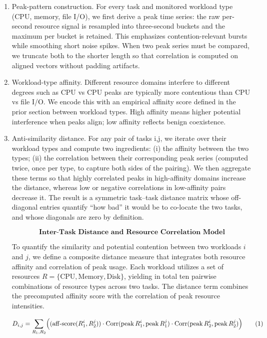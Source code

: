 \begin{enumerate}
    \item Peak-pattern construction. For every task and monitored workload type (CPU, memory, file I/O), we first derive a peak time series: the raw per-second resource signal is resampled into three-second buckets and the maximum per bucket is retained. This emphasizes contention-relevant bursts while smoothing short noise spikes. When two peak series must be compared, we truncate both to the shorter length so that correlation is computed on aligned vectors without padding artifacts.
    \item Workload-type affinity. Different resource domains interfere to different degrees such as CPU vs CPU peaks are typically more contentious than CPU vs file I/O. We encode this with an empirical affinity score defined in the prior section between workload types. High affinity means higher potential interference when peaks align; low affinity reflects benign coexistence.
    \item Anti-similarity distance. For any pair of tasks i,j, we iterate over their workload types and compute two ingredients: (i) the affinity between the two types; (ii) the correlation between their corresponding peak series (computed twice, once per type, to capture both sides of the pairing). We then aggregate these terms so that highly correlated peaks in high-affinity domains increase the distance, whereas low or negative correlations in low-affinity pairs decrease it. The result is a symmetric task–task distance matrix whose off-diagonal entries quantify “how bad” it would be to co-locate the two tasks, and whose diagonals are zero by definition.

          \[
              \textbf{Inter-Task Distance and Resource Correlation Model}
          \]

          To quantify the similarity and potential contention between two workloads
          \( i \) and \( j \), we define a composite distance measure
          that integrates both resource affinity and correlation of peak usage.
          Each workload utilizes a set of resources
          \( R = \{ \text{CPU}, \text{Memory}, \text{Disk}\} \),
          yielding in total ten pairwise combinations of resource types across two tasks.
          The distance term combines the precomputed affinity score with the
          correlation of peak resource intensities.

          \[
              D_{i,j}
              = \sum_{R_1, R_2}
              \Bigl(
              (\mathrm{aff\text{-}score}(R_1^i, R_2^j))
              \cdot
              \mathrm{Corr}(\mathrm{peak}\,R_1^i, \mathrm{peak}\,R_1^j)
              \cdot
              \mathrm{Corr}(\mathrm{peak}\,R_2^i, \mathrm{peak}\,R_2^j)
              \Bigr)
              \tag{1}
          \]


\end{enumerate}
